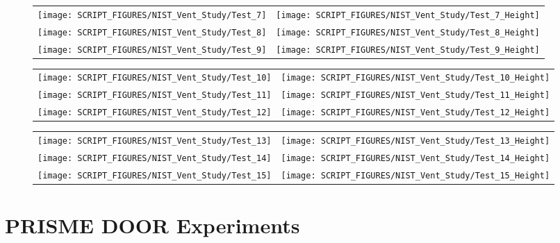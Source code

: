 \begin{figure}[!ht]
\begin{tabular*}{\textwidth}{l@{\extracolsep{\fill}}r}
\texttt{[image: SCRIPT\_FIGURES/NIST\_Vent\_Study/Test\_7]} &
\texttt{[image: SCRIPT\_FIGURES/NIST\_Vent\_Study/Test\_7\_Height]} \\
\texttt{[image: SCRIPT\_FIGURES/NIST\_Vent\_Study/Test\_8]} &
\texttt{[image: SCRIPT\_FIGURES/NIST\_Vent\_Study/Test\_8\_Height]} \\
\texttt{[image: SCRIPT\_FIGURES/NIST\_Vent\_Study/Test\_9]} &
\texttt{[image: SCRIPT\_FIGURES/NIST\_Vent\_Study/Test\_9\_Height]}
\end{tabular*}
\end{figure}

\begin{figure}[!ht]
\begin{tabular*}{\textwidth}{l@{\extracolsep{\fill}}r}
\texttt{[image: SCRIPT\_FIGURES/NIST\_Vent\_Study/Test\_10]} &
\texttt{[image: SCRIPT\_FIGURES/NIST\_Vent\_Study/Test\_10\_Height]} \\
\texttt{[image: SCRIPT\_FIGURES/NIST\_Vent\_Study/Test\_11]} &
\texttt{[image: SCRIPT\_FIGURES/NIST\_Vent\_Study/Test\_11\_Height]} \\
\texttt{[image: SCRIPT\_FIGURES/NIST\_Vent\_Study/Test\_12]} &
\texttt{[image: SCRIPT\_FIGURES/NIST\_Vent\_Study/Test\_12\_Height]}
\end{tabular*}
\end{figure}

\begin{figure}[!ht]
\begin{tabular*}{\textwidth}{l@{\extracolsep{\fill}}r}
\texttt{[image: SCRIPT\_FIGURES/NIST\_Vent\_Study/Test\_13]} &
\texttt{[image: SCRIPT\_FIGURES/NIST\_Vent\_Study/Test\_13\_Height]} \\
\texttt{[image: SCRIPT\_FIGURES/NIST\_Vent\_Study/Test\_14]} &
\texttt{[image: SCRIPT\_FIGURES/NIST\_Vent\_Study/Test\_14\_Height]} \\
\texttt{[image: SCRIPT\_FIGURES/NIST\_Vent\_Study/Test\_15]} &
\texttt{[image: SCRIPT\_FIGURES/NIST\_Vent\_Study/Test\_15\_Height]}
\end{tabular*}
\end{figure}

\clearpage

\section{PRISME DOOR Experiments}

